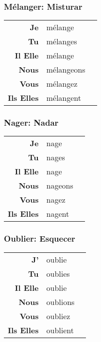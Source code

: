 \documentclass{subfiles}
\begin{document}
\begin{multicols*}{3}
        \subsubsection{Mélanger: Misturar}
            \begin{tabular}{r l r}
                \textbf{Je}        & mélange    &\\
                \textbf{Tu}        & mélanges   &\\
                \textbf{Il Elle}   & mélange    &\\
                \textbf{Nous}      & mélangeons &\\
                \textbf{Vous}      & mélangez   &\\
                \textbf{Ils Elles} & mélangent  &
            \end{tabular}

        \subsubsection{Nager: Nadar}
            \begin{tabular}{r l r}
                \textbf{Je}        & nage    &\\
                \textbf{Tu}        & nages   &\\
                \textbf{Il Elle}   & nage    &\\
                \textbf{Nous}      & nageons &\\
                \textbf{Vous}      & nagez   &\\
                \textbf{Ils Elles} & nagent  &
            \end{tabular}
        
        \subsubsection{Oublier: Esquecer}
            \begin{tabular}{r l r}
                \textbf{J'}        & oublie   &\\
                \textbf{Tu}        & oublies  &\\
                \textbf{Il Elle}   & oublie   &\\
                \textbf{Nous}      & oublions &\\
                \textbf{Vous}      & oubliez  &\\
                \textbf{Ils Elles} & oublient &
            \end{tabular}


\end{multicols*}
\end{document}

